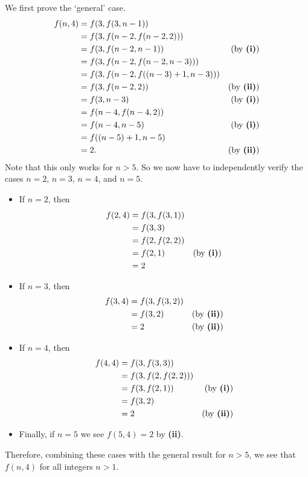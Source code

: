 \begin{questions}
\begin{partquestions}{\roman*}
        \item We first prove the `general' case.
        \begin{align*}
            f(n, 4) &= f(3, f(3, n-1))\\
            &= f(3, f(n-2, f(n-2, 2)))\\
            &= f(3, f(n-2, n-1)) & (\text{by \textbf{(i)}})\\
            &= f(3, f(n-2, f(n-2, n-3)))\\
            &= f(3, f(n-2, f((n-3)+1, n-3)))\\
            &= f(3, f(n-2, 2)) & (\text{by \textbf{(ii)}})\\
            &= f(3, n-3) & (\text{by \textbf{(i)}})\\
            &= f(n-4, f(n-4, 2))\\
            &= f(n-4, n-5) & (\text{by \textbf{(i)}})\\
            &= f((n-5)+1, n-5)\\
            &= 2. & (\text{by \textbf{(ii)}})
        \end{align*}
        Note that this only works for $n > 5$. So we now have to independently verify the cases $n = 2$, $n = 3$, $n = 4$, and $n = 5$.
        \begin{itemize}
            \item If $n = 2$, then
            \begin{align*}
                f(2, 4) &= f(3, f(3, 1))\\
                &= f(3, 3)\\
                &= f(2, f(2, 2))\\
                &= f(2, 1) & (\text{by \textbf{(i)}})\\
                &= 2
            \end{align*}
            \item If $n = 3$, then
            \begin{align*}
                f(3, 4) &= f(3, f(3, 2))\\
                &= f(3, 2) & (\text{by \textbf{(ii)}})\\
                &= 2 & (\text{by \textbf{(ii)}})
            \end{align*}
            \item If $n = 4$, then
            \begin{align*}
                f(4, 4) &= f(3, f(3, 3))\\
                &= f(3, f(2, f(2, 2)))\\
                &= f(3, f(2, 1)) & (\text{by \textbf{(i)}})\\
                &= f(3, 2)\\
                &= 2 & (\text{by \textbf{(ii)}})
            \end{align*}
            \item Finally, if $n = 5$ we see $f(5, 4) = 2$ by \textbf{(ii)}.
        \end{itemize}
        Therefore, combining these cases with the general result for $n > 5$, we see that $f(n, 4)$ for all integers $n > 1$.
    \end{partquestions}


\end{questions}

